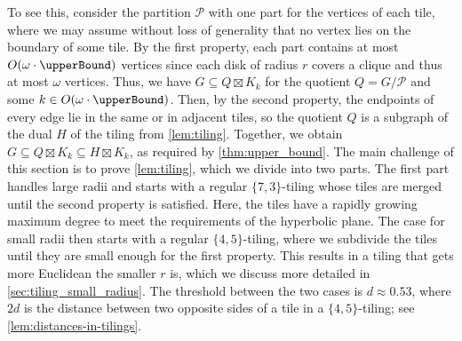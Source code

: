 \documentclass[11pt]{article}
\newtheorem{lemma}[theorem]{Lemma}
\providecommand{\todo}[2][]{}
\newcommand{\calP}{\ensuremath{\mathcal{P}}\xspace}
\newcommand{\Hyp}{\ensuremath{\mathbb{H}}\xspace}
\begin{document}
To see this, consider the partition \calP with one part for the vertices of each tile, where we may assume without loss of generality that no vertex lies on the boundary of some tile.
By the first property, each part contains at most $ O(\omega \cdot \upperBound) $ vertices since each disk of radius $ r $ covers a clique and thus at most $ \omega $ vertices.
Thus, we have $ G \subseteq Q \boxtimes K_k $ for the quotient $ Q = G / \calP $ and some $ k \in {O(\omega \cdot \upperBound)} $.
Then, by the second property, the endpoints of every edge lie in the same or in adjacent tiles, so the quotient $ Q $ is a subgraph of the dual $ H $ of the tiling from \cref{lem:tiling}.
Together, we obtain $ G \subseteq Q \boxtimes K_k \subseteq H \boxtimes K_k $, as required by \cref{thm:upper_bound}.
%
The main challenge of this section is to prove \cref{lem:tiling}, which we divide into two parts.
The first part handles large radii and starts with a regular $ \{7, 3\} $-tiling whose tiles are merged until the second property is satisfied.
Here, the tiles have a rapidly growing maximum degree to meet the requirements of the hyperbolic plane.
The case for small radii then starts with a regular $ \{ 4, 5 \} $-tiling, where we subdivide the tiles until they are small enough for the first property.
This results in a tiling that gets more Euclidean the smaller $ r $ is, which we discuss more detailed in \cref{sec:tiling_small_radius}.
The threshold between the two cases is $ d \approx 0.53 $, where $ 2d $ is the distance between two opposite sides of a tile in a $ \{ 4, 5 \} $-tiling; see \cref{lem:distances-in-tilings}.
%
%
%
% 
%     
\end{document}
